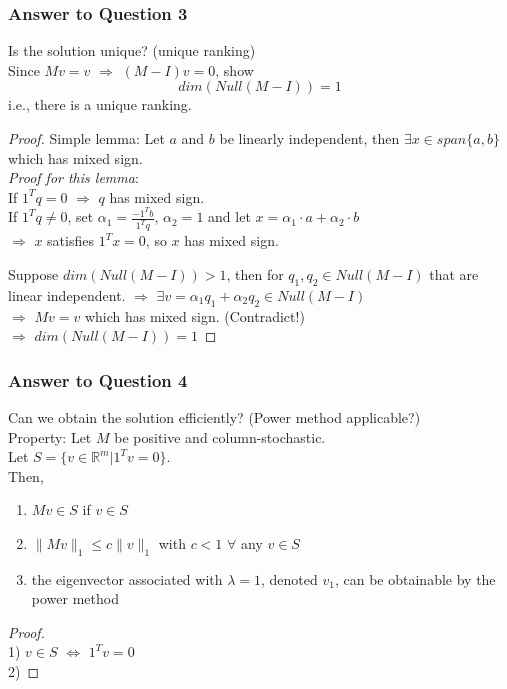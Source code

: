 \begin{multicols}{2}
\subsubsection{Answer to Question 3}
Is the solution unique? (unique ranking) \\
Since $Mv=v$ $\Longrightarrow$ $(M-I)v=0$, show 
\[
    dim(Null(M-I))=1
\]
i.e., there is a unique ranking.

\begin{proof}

    Simple lemma: Let $a$ and $b$ be linearly independent, then $\exists x\in span\{a,b\}$ which has mixed sign. \\
    \emph{Proof for this lemma}: \\
    If $1^Tq=0$ $\Longrightarrow$ $q$ has mixed sign. \\
    If $1^Tq\neq 0$, set $\alpha_1 = \frac{-1^Tb}{1^Tq}$, $\alpha_2=1$ and let $x=\alpha_1\cdot a+\alpha_2\cdot b$ \\
    $\Longrightarrow$ $x$ satisfies $1^Tx=0$, so $x$ has mixed sign.

    Suppose $dim(Null(M-I))>1$, then for $q_1,q_2\in Null(M-I)$ that are linear independent.
    $\Longrightarrow$ $\exists v= \alpha_1 q_1  + \alpha_2 q_2 \in Null(M-I)$ \\
    $\Longrightarrow$ $Mv=v$ which has mixed sign. (Contradict!) \\
    $\Longrightarrow$ $dim(Null(M-I))=1$
\end{proof}

\subsubsection{Answer to Question 4}
Can we obtain the solution efficiently? (Power method applicable?) \\
Property:
Let $M$ be positive and column-stochastic. \\
Let $S=\{v\in \mathbb{R}^m | 1^Tv=0 \}$. \\
Then,
\begin{enumerate}
    \item $Mv\in S$ if $v\in S$
    \item $\|Mv\|_1 \leq c\|v\|_1$ with $c<1$ $\forall$ any $v\in S$
    \item the eigenvector associated with $\lambda=1$, denoted $v_1$, can be obtainable by the power method
\end{enumerate}
\begin{proof} \\
    1) $v\in S$ $\Longleftrightarrow$ $1^Tv=0$ \\
    2) 
\end{proof}
\newpage
\end{multicols}